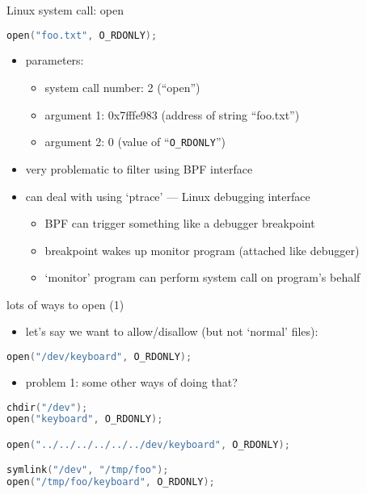 
\begin{frame}[fragile,label=open]{Linux system call: open}
\begin{lstlisting}[language=C,style=small]
open("foo.txt", O_RDONLY);
\end{lstlisting}
\begin{itemize}
\item parameters:
    \begin{itemize}
    \item system call number: 2 (``open'')
    \item argument 1: 0x7fffe983 (address of string ``foo.txt'')
    \item argument 2: 0 (value of ``\texttt{O\_RDONLY}'')
    \end{itemize}
\item very problematic to filter using BPF interface
\vspace{.5cm}
\item can deal with using `ptrace' --- Linux debugging interface
    \begin{itemize}
    \item BPF can trigger something like a debugger breakpoint
    \item breakpoint wakes up monitor program (attached like debugger)
    \item `monitor' program can perform system call on program's behalf
    \end{itemize}
\end{itemize}
\end{frame}


\begin{frame}[fragile,label=openRuleP1]{lots of ways to open (1)}
\begin{itemize}
\item let's say we want to allow/disallow (but not `normal' files):
\end{itemize}
\begin{lstlisting}[language=C,style=smaller]
open("/dev/keyboard", O_RDONLY);
\end{lstlisting}
\begin{itemize}
\item problem 1: some other ways of doing that?
\end{itemize}
\begin{lstlisting}[language=C,style=smaller]
chdir("/dev");
open("keyboard", O_RDONLY);

open("../../../../../../dev/keyboard", O_RDONLY);

symlink("/dev", "/tmp/foo");
open("/tmp/foo/keyboard", O_RDONLY);
\end{lstlisting}
\end{frame}

